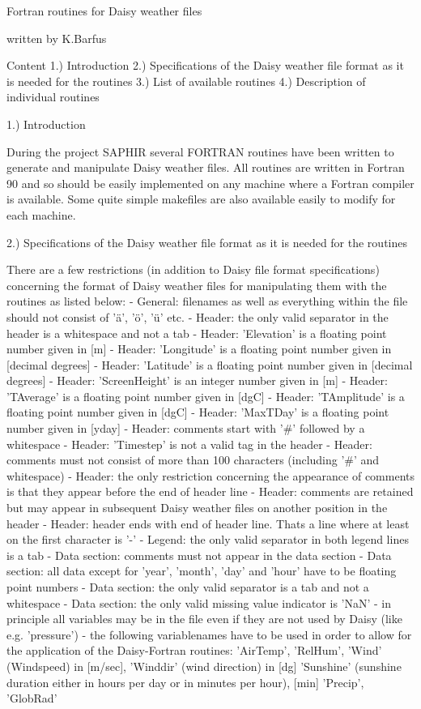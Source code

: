 Fortran routines for Daisy weather files

written by K.Barfus

Content
1.) Introduction
2.) Specifications of the Daisy weather file format as it is needed for the routines
3.) List of available routines
4.) Description of individual routines


1.) Introduction

During the project SAPHIR several FORTRAN routines have been written to generate and manipulate Daisy weather files. All routines are written in Fortran 90 and so should be easily implemented on any machine where a Fortran compiler is available. Some quite simple makefiles are also available easily to modify for each machine.

2.) Specifications of the Daisy weather file format as it is needed for the routines

There are a few restrictions (in addition to Daisy file format specifications) concerning the format of Daisy weather files for manipulating them with the routines as listed below:
- General: filenames as well as everything within the file should not consist of 'ä', 'ö', 'ü' etc.
- Header: the only valid separator in the header is a whitespace and not a tab
- Header: 'Elevation' is a floating point number given in [m]
- Header: 'Longitude' is a floating point number given in [decimal degrees]
- Header: 'Latitude' is a floating point number given in [decimal degrees]
- Header: 'ScreenHeight' is an integer number given in [m]
- Header: 'TAverage' is a floating point number given in [dgC]
- Header: 'TAmplitude' is a floating point number given in [dgC]
- Header: 'MaxTDay' is a floating point number given in [yday]
- Header: comments start with '#' followed by a whitespace
- Header: 'Timestep' is not a valid tag in the header
- Header: comments must not consist of more than 100 characters (including '#' and whitespace)
- Header: the only restriction concerning the appearance of comments is that they appear before the end of header line
- Header: comments are retained but may appear in subsequent Daisy weather files on another position in the  header
- Header: header ends with end of header line. Thats a line where at least on the first character is '-'
- Legend: the only valid separator in both legend lines is a tab 
- Data section: comments must not appear in the data section
- Data section: all data except for 'year', 'month', 'day' and 'hour' have to be floating point numbers
- Data section: the only valid separator is a tab and not a whitespace
- Data section: the only valid missing value indicator is 'NaN'
- in principle all variables may be in the file even if they are not used by Daisy (like e.g. 'pressure')
- the following variablenames have to be used in order to allow for the application of the Daisy-Fortran routines: 
	'AirTemp', 
	'RelHum', 
	'Wind' (Windspeed) in [m/sec], 
	'Winddir' (wind direction) in [dg]
	'Sunshine' (sunshine duration either in hours per day or in minutes per hour), [min]
	'Precip', 'GlobRad'


